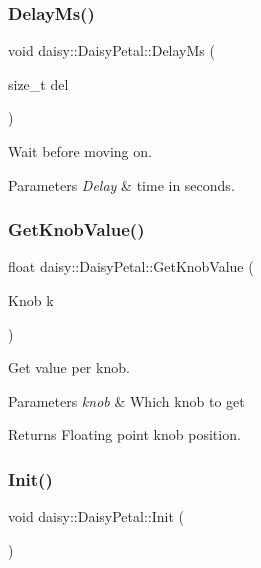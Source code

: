 \begin{DoxyCompactItemize}
\subsubsection{\texorpdfstring{Delay\+Ms()}{DelayMs()}}
{\footnotesize\ttfamily void daisy\+::\+Daisy\+Petal\+::\+Delay\+Ms (\begin{DoxyParamCaption}\item[{size\+\_\+t}]{del }\end{DoxyParamCaption})}

Wait before moving on. 
\begin{DoxyParams}{Parameters}
{\em Delay} & time in seconds. \\
\hline
\end{DoxyParams}
\mbox{\label{classdaisy_1_1_daisy_petal_a1e0156fca684721f0ae445b8e4c2ebd7}} 
\subsubsection{\texorpdfstring{Get\+Knob\+Value()}{GetKnobValue()}}
{\footnotesize\ttfamily float daisy\+::\+Daisy\+Petal\+::\+Get\+Knob\+Value (\begin{DoxyParamCaption}\item[{Knob}]{k }\end{DoxyParamCaption})}

Get value per knob. 
\begin{DoxyParams}{Parameters}
{\em knob} & Which knob to get \\
\hline
\end{DoxyParams}
\begin{DoxyReturn}{Returns}
Floating point knob position. 
\end{DoxyReturn}
\mbox{\label{classdaisy_1_1_daisy_petal_aaf7fbbfc6455612354a92382f5b499e7}} 
\subsubsection{\texorpdfstring{Init()}{Init()}}
{\footnotesize\ttfamily void daisy\+::\+Daisy\+Petal\+::\+Init (\begin{DoxyParamCaption}{ }\end{DoxyParamCaption})}


\end{DoxyCompactItemize}
